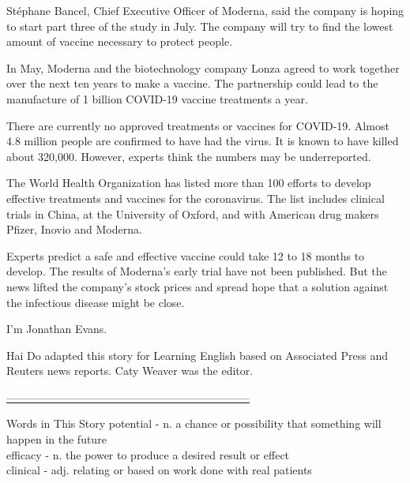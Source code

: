 Stéphane Bancel, Chief Executive Officer of Moderna, said the company is hoping to start part three of the study in July. The company will try to find the lowest amount of vaccine necessary to protect people.

In May, Moderna and the biotechnology company Lonza agreed to work together over the next ten years to make a vaccine. The partnership could lead to the manufacture of 1 billion COVID-19 vaccine treatments a year.

There are currently no approved treatments or vaccines for COVID-19. Almost 4.8 million people are confirmed to have had the virus. It is known to have killed about 320,000. However, experts think the numbers may be underreported.

The World Health Organization has listed more than 100 efforts to develop effective treatments and vaccines for the coronavirus. The list includes clinical trials in China, at the University of Oxford, and with American drug makers Pfizer, Inovio and Moderna.

Experts predict a safe and effective vaccine could take 12 to 18 months to develop. The results of Moderna's early trial have not been published. But the news lifted the company's stock prices and spread hope that a solution against the infectious disease might be close.

I'm Jonathan Evans.

Hai Do adapted this story for Learning English based on Associated Press and Reuters news reports. Caty Weaver was the editor.

\underline{------------------------------------------------------------------}

Words in This Story
potential - n. a chance or possibility that something will happen in the future\\

efficacy - n. the power to produce a desired result or effect\\

clinical - adj. relating or based on work done with real patients\\
